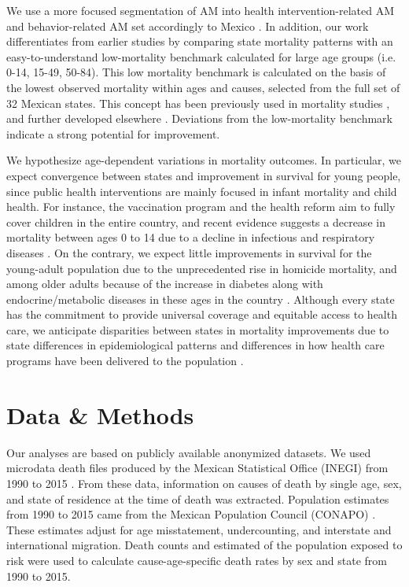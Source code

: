 \documentclass{bmcart}
\begin{document}
We use a more focused segmentation of AM into health intervention-related AM and
behavior-related AM set accordingly to Mexico \cite{Aburto2015}. In addition, our work differentiates from earlier studies by comparing state mortality patterns with an easy-to-understand low-mortality benchmark calculated for large age groups (i.e. 0-14, 15-49, 50-84). This low mortality
benchmark is calculated on the basis of the lowest observed mortality within
ages and causes, selected from the full set of 32 Mexican states. This concept has been previously used in mortality studies \cite{whelpton1947}, and further developed elsewhere 
\cite{wunsch1975minimum,vallin2008minimum}. Deviations from the low-mortality benchmark indicate a strong potential for improvement.

We hypothesize age-dependent variations in mortality outcomes.
In particular, we expect convergence between states and improvement in survival
for young people, since public health interventions are mainly focused in infant
mortality and child health. For instance, the vaccination program and the health
reform aim to fully cover children in the entire country, and recent
evidence suggests a decrease in mortality between ages 0 to 14 due to a decline
in infectious and respiratory diseases \cite{gonzalez2016mexico}. On the contrary, we
expect little improvements in survival for the  young-adult population due to the unprecedented rise in homicide mortality, and among older adults because of the increase in diabetes along with endocrine/metabolic diseases in these ages in the country \cite{gonzalez2011health,gonzalez2016mexico}. Although every
state has the commitment to provide universal coverage and equitable access to
health care, we anticipate disparities between states
in mortality improvements due to state differences in epidemiological patterns  \cite{gomez2016dissonant} and differences in how  health care programs have been delivered to the population
\cite{Frenk2006}.


\section*{Data \& Methods} 
Our analyses are based on publicly available anonymized datasets. We used microdata death files produced by the
Mexican Statistical Office (INEGI) from 1990 to 2015 \cite{INEGI}. From these data, 
information on causes of death by single age, sex, and state of residence at the
time of death was extracted. Population estimates from 1990 to 2015 came from the Mexican Population Council (CONAPO) \cite{CONAPO}. These estimates adjust for age misstatement, undercounting, and interstate and international migration. Death counts and estimated of the population exposed to risk were used to calculate cause-age-specific death rates by sex and state from 1990 to 2015.
\end{document}
